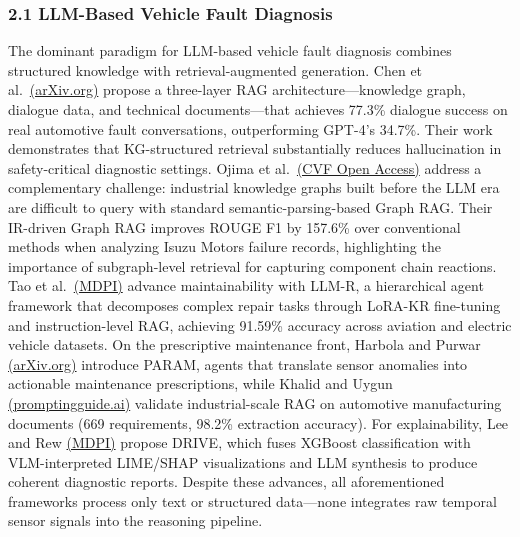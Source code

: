 \documentclass[
  11pt,
]{article}
\newcounter{none} %
\begin{document}
\subsubsection{2.1 LLM-Based Vehicle Fault
Diagnosis}\label{llm-based-vehicle-fault-diagnosis}

The dominant paradigm for LLM-based vehicle fault diagnosis combines
structured knowledge with retrieval-augmented generation. Chen et
al.~\href{https://arxiv.org/html/2411.14256v1}{(arXiv.org)} propose a
three-layer RAG architecture---knowledge graph, dialogue data, and
technical documents---that achieves 77.3\% dialogue success on real
automotive fault conversations, outperforming GPT-4's 34.7\%. Their work
demonstrates that KG-structured retrieval substantially reduces
hallucination in safety-critical diagnostic settings. Ojima et
al.~\href{https://openaccess.thecvf.com/content/WACV2026W/LLVM-AD/papers/Chennaka_Trust-Guided_Multimodal_LLM_Integration_with_Reinforcement_Learning_for_Autonomous_Driving_WACVW_2026_paper.pdf}{(CVF
Open Access)} address a complementary challenge: industrial knowledge
graphs built before the LLM era are difficult to query with standard
semantic-parsing-based Graph RAG. Their IR-driven Graph RAG improves
ROUGE F1 by 157.6\% over conventional methods when analyzing Isuzu
Motors failure records, highlighting the importance of subgraph-level
retrieval for capturing component chain reactions. Tao et
al.~\href{https://www.mdpi.com/1424-8220/25/19/6033}{(MDPI)} advance
maintainability with LLM-R, a hierarchical agent framework that
decomposes complex repair tasks through LoRA-KR fine-tuning and
instruction-level RAG, achieving 91.59\% accuracy across aviation and
electric vehicle datasets. On the prescriptive maintenance front,
Harbola and Purwar \href{https://arxiv.org/abs/2411.19443}{(arXiv.org)}
introduce PARAM, agents that translate sensor anomalies into actionable
maintenance prescriptions, while Khalid and Uygun
\href{https://www.promptingguide.ai/research/rag}{(promptingguide.ai)}
validate industrial-scale RAG on automotive manufacturing documents (669
requirements, 98.2\% extraction accuracy). For explainability, Lee and
Rew \href{https://www.mdpi.com/2079-9292/14/21/4180}{(MDPI)} propose
DRIVE, which fuses XGBoost classification with VLM-interpreted LIME/SHAP
visualizations and LLM synthesis to produce coherent diagnostic reports.
Despite these advances, all aforementioned frameworks process only text
or structured data---none integrates raw temporal sensor signals into
the reasoning pipeline.
\end{document}
